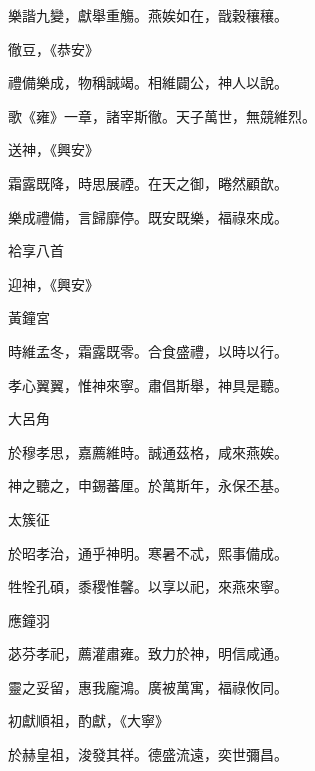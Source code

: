 \begin{pinyinscope}
 樂諧九變，獻舉重觴。燕娭如在，戩穀穰穰。



 徹豆，《恭安》



 禮備樂成，物稱誠竭。相維闢公，神人以說。



 歌《雍》一章，諸宰斯徹。天子萬世，無競維烈。



 送神，《興安》



 霜露既降，時思展禋。在天之御，睠然顧歆。



 樂成禮備，言歸靡停。既安既樂，福祿來成。



 袷享八首



 迎神，《興安》



 黃鐘宮



 時維孟冬，霜露既零。合食盛禮，以時以行。



 孝心翼翼，惟神來寧。肅倡斯舉，神具是聽。



 大呂角



 於穆孝思，嘉薦維時。誠通茲格，咸來燕娭。



 神之聽之，申錫蕃厘。於萬斯年，永保丕基。



 太簇征



 於昭孝治，通乎神明。寒暑不忒，熙事備成。



 牲牷孔碩，黍稷惟馨。以享以祀，來燕來寧。



 應鐘羽



 苾芬孝祀，薦灌肅雍。致力於神，明信咸通。



 靈之妥留，惠我龐鴻。廣被萬寓，福祿攸同。



 初獻順祖，酌獻，《大寧》



 於赫皇祖，浚發其祥。德盛流遠，奕世彌昌。




\end{pinyinscope}
